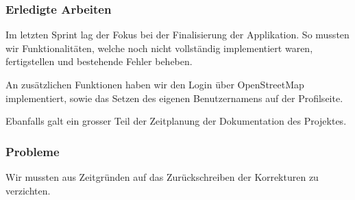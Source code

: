 \subsubsection{Erledigte Arbeiten}

Im letzten Sprint lag der Fokus bei der Finalisierung der Applikation.
So mussten wir Funktionalitäten, welche noch nicht vollständig implementiert waren, fertigstellen und bestehende Fehler beheben.

An zusätzlichen Funktionen haben wir den Login über OpenStreetMap implementiert, sowie das Setzen des eigenen Benutzernamens auf der Profilseite.

Ebanfalls galt ein grosser Teil der Zeitplanung der Dokumentation des Projektes.

\subsubsection{Probleme}
Wir mussten aus Zeitgründen auf das Zurückschreiben der Korrekturen zu  verzichten.